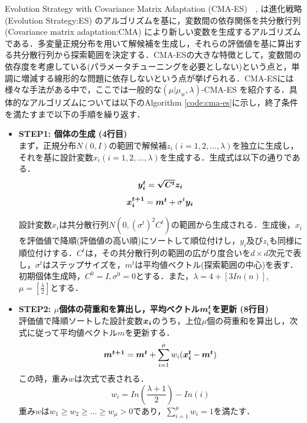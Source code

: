 \documentclass[a4j,11pt]{jarticle}
\begin{document}
Evolution Strategy with Covariance Matrix Adaptation (CMA-ES)　\cite{mu-CMA-ES}, \cite{CMA-ES} は進化戦略 (Evolution Strategy:ES) \cite{ES} のアルゴリズムを基に，変数間の依存関係を共分散行列 (Covariance matrix adaptation:CMA) \cite{CMA} により新しい変数を生成するアルゴリズムである．多変量正規分布を用いて解候補を生成し，それらの評価値を基に算出する共分散行列から探索範囲を決定する．CMA-ESの大きな特徴として，変数間の依存度を考慮している(パラメータチューニングを必要としない)という点と，単調に増減する線形的な問題に依存しないという点が挙げられる．CMA-ESには様々な手法がある中で，ここでは一般的な$(\mu|\mu_w,\lambda)$-CMA-ES \cite{CMA-ES} を紹介する．具体的なアルゴリズムについては以下のAlgorithm \ref{code:cma-es}に示し，終了条件を満たすまで以下の手順を繰り返す．
\begin{itemize}
\item {\bf STEP1: 個体の生成 (4行目)} 　\\
まず，正規分布$N(0,I)$の範囲で解候補$z_i (i=1,2,...,\lambda)$を独立に生成し，それを基に設計変数$x_i (i=1,2,...,\lambda)$を生成する．生成式は以下の通りである．
\begin{equation}
\label{eq:cmaes-yi}
\mbox{\boldmath $y_i^t$}=\mbox{\boldmath $\sqrt{C^t}z_i$}
\end{equation}
\begin{equation}
\label{eq:cmaes-xi}
\mbox{\boldmath $x_i^{t+1}$}=\mbox{\boldmath $m^t$}+ \sigma ^t \mbox{\boldmath $y_i$}
\end{equation}

設計変数$x_i$は共分散行列$N(0,(\sigma^t)^2 C^t)$の範囲から生成される．生成後，$x_i$を評価値で降順(評価値の高い順)にソートして順位付けし，$y_i$及び$z_i$も同様に順位付けする．$C^t$は，その共分散行列の範囲の広がり度合いを$d \times d$次元で表し，$\sigma^t$はステップサイズを，$m^t$は平均値ベクトル(探索範囲の中心)を表す．初期個体生成時，$C^0=I, \sigma^0=0$とする．また，$\lambda=4+[3In(n)]$, $\mu=[\frac{\lambda}{2}]$とする．

\item {\bf STEP2: $\mu$個体の荷重和を算出し，平均ベクトル$\mbox{\boldmath $m_i^t$}$を更新 (8行目)} \\
評価値で降順ソートした設計変数$\mbox{\boldmath $x_i$}$のうち，上位$\mu$個の荷重和を算出し，次式に従って平均値ベクトル$m$を更新する．
\begin{equation}
\label{eq:cmaes-mi}
\mbox{\boldmath $m^{t+1}$}=\mbox{\boldmath $m^t$}+ \sum_{i=1}^{\mu}w_i(\mbox{\boldmath $x_i^t$}-\mbox{\boldmath $m^t$})
\end{equation}
この時，重み$w$は次式で表される．
\begin{equation}
\label{eq:cmaes-w}
w_i=In(\frac{\lambda+1}{2})-In(i)
\end{equation}
重み$w$は$w_1 \geq w_2 \geq ... \geq w_\mu > 0$であり，$\sum_{i=1}^{\mu}w_i=1$を満たす．


\end{itemize}
\end{document}
